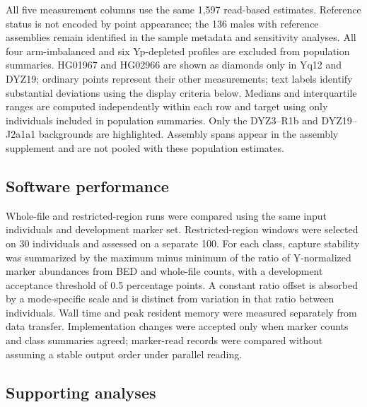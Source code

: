 All five measurement columns use the same 1,597 read-based estimates. Reference status is not encoded by point appearance; the 136 males with reference assemblies remain identified in the sample metadata and sensitivity analyses. All four arm-imbalanced and six Yp-depleted profiles are excluded from population summaries. HG01967 and HG02966 are shown as diamonds only in Yq12 and DYZ19; ordinary points represent their other measurements; text labels identify substantial deviations using the display criteria below. Medians and interquartile ranges are computed independently within each row and target using only individuals included in population summaries. Only the DYZ3--R1b and DYZ19--J2a1a1 backgrounds are highlighted. Assembly spans appear in the assembly supplement and are not pooled with these population estimates.

\subsection{Software performance}\label{sec:m-performance}
Whole-file and restricted-region runs were compared using the same input individuals and development marker set. Restricted-region windows were selected on 30 individuals and assessed on a separate 100. For each class, capture stability was summarized by the maximum minus minimum of the ratio of Y-normalized marker abundances from BED and whole-file counts, with a development acceptance threshold of 0.5 percentage points. A constant ratio offset is absorbed by a mode-specific scale and is distinct from variation in that ratio between individuals. Wall time and peak resident memory were measured separately from data transfer. Implementation changes were accepted only when marker counts and class summaries agreed; marker-read records were compared without assuming a stable output order under parallel reading.



\subsection{Supporting analyses}\label{sec:m-supporting}


